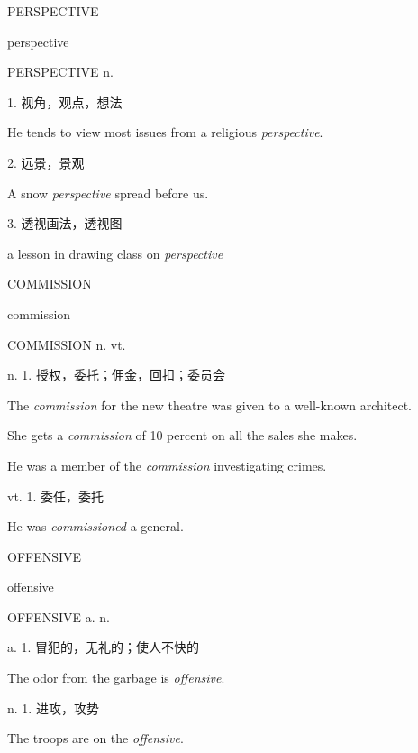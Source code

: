 \begin{flashcard}{
PERSPECTIVE

perspective
}
\begin{center}
PERSPECTIVE n. 
\end{center}
1. 视角，观点，想法

He tends to view most issues from a religious \textit{perspective}.

2. 远景，景观

A snow \textit{perspective} spread before us.

3. 透视画法，透视图

a lesson in drawing class on \textit{perspective}

\end{flashcard}
\begin{flashcard}{
COMMISSION

commission
}
\begin{center}
COMMISSION n. vt. 
\end{center}
n. 1. 授权，委托；佣金，回扣；委员会

The \textit{commission} for the new theatre was given to a well-known architect.

She gets a \textit{commission} of 10 percent on all the sales she makes.

He was a member of the \textit{commission} investigating crimes.

vt. 1. 委任，委托

He was \textit{commissioned} a general.

\end{flashcard}
\begin{flashcard}{
OFFENSIVE

offensive
}
\begin{center}
OFFENSIVE a. n. 
\end{center}
a. 1. 冒犯的，无礼的；使人不快的

The odor from the garbage is \textit{offensive}.

n. 1. 进攻，攻势

The troops are on the \textit{offensive}.

\end{flashcard}
